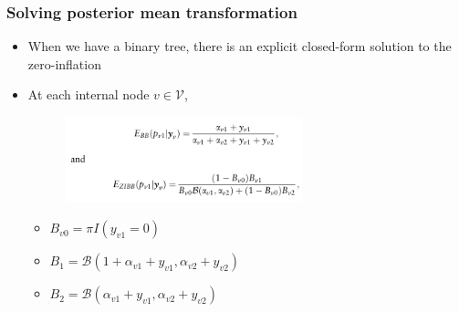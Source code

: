 \documentclass{beamer}
\begin{document}
\begin{frame}
\frametitle{Solving posterior mean transformation}
\begin{itemize}
  \item When we have a binary tree, there is an explicit closed-form solution to the zero-inflation
  \item At each internal node $v \in \mathcal{V}$,
  \begin{figure}[!htb]
	\centering
	\includegraphics[width=0.65\textwidth]{img/ebbzib.png}
  \end{figure}
  \begin{itemize}
    \item $B_{v0} = \pi I(y_{v1} = 0)$
    \item $B_1 = \mathcal{B}(1 + \alpha_{v1} + y_{v1}, \alpha_{v2} + y_{v2})$
    \item $B_2 = \mathcal{B}(\alpha_{v1} + y_{v1}, \alpha_{v2} + y_{v2})$
  \end{itemize}

\end{itemize}
\end{frame}
\end{document}

